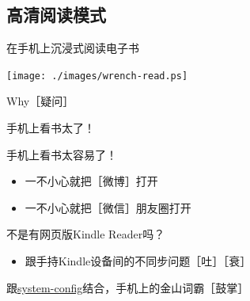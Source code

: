 \documentclass[presentation,dvipdfmx,CJKbookmarks]{beamer}
\begin{document}
\begin{CJK*}{UTF8}{simsun}
\section{高清阅读模式}
\label{sec:orgf597348}
\begin{frame}[label={sec:org111f9b2}]{在手机上沉浸式阅读电子书}
\begin{center}
\texttt{[image: ./images/wrench-read.ps]}
\end{center}
\end{frame}

\begin{frame}[label={sec:org635bb96}]{Why［疑问］}
\begin{block}{手机上看书太了！}
\end{block}
\begin{block}{手机上看书太容易了！}
\begin{itemize}
\item 一不小心就把［微博］打开
\item 一不小心就把［微信］朋友圈打开
\end{itemize}
\end{block}
\begin{block}{不是有网页版\thinspace Kindle Reader\thinspace 吗？}
\begin{itemize}
\item 跟手持\thinspace Kindle\thinspace 设备间的不同步问题［吐］［衰］
\end{itemize}
\end{block}
\begin{block}{跟\thinspace \href{https://github.com/baohaojun/system-config}{system-config}\thinspace 结合，手机上的金山词霸［鼓掌］}
\end{block}
\end{frame}
\end{CJK*}
\end{document}
